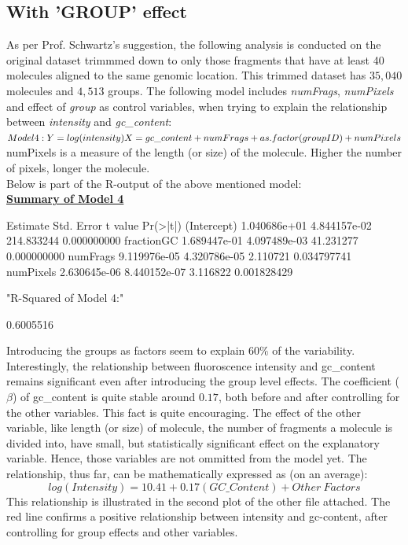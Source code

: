\documentclass[11pt]{article}
\begin{document}
\subsection{With 'GROUP' effect}
As per Prof. Schwartz's suggestion, the following analysis is conducted on the original dataset trimmmed down to only those fragments that have at least 40 molecules aligned to the same genomic location. This trimmed dataset has $35,040$ molecules and $4,513$ groups. The following model includes {\emph{numFrags}}, {\emph{numPixels}} and effect of {\emph{group}} as control variables, when trying to explain the relationship between {\emph{intensity}} and {\emph{gc\_content}}:
$Model4:\\ Y = log(intensity) \\ X = gc\_content + numFrags + as.factor(groupID) + numPixels$ \\
numPixels is a measure of the length (or size) of the molecule. Higher the number of pixels, longer the molecule. 
\\
Below is part of the R-output of the above mentioned model:\\
\noindent
{\bf{\underline{Summary of Model 4}}}
\begin{Schunk}
\begin{Soutput}
                Estimate   Std. Error    t value    Pr(>|t|)
(Intercept) 1.040686e+01 4.844157e-02 214.833244 0.000000000
fractionGC  1.689447e-01 4.097489e-03  41.231277 0.000000000
numFrags    9.119976e-05 4.320786e-05   2.110721 0.034797741
numPixels   2.630645e-06 8.440152e-07   3.116822 0.001828429
\end{Soutput}
\begin{Soutput}
[1] "R-Squared of Model 4:"
\end{Soutput}
\begin{Soutput}
[1] 0.6005516
\end{Soutput}
\end{Schunk}
Introducing the groups as factors seem to explain $60\%$ of the variability. Interestingly, the relationship between fluoroscence intensity and gc\_content remains significant even after introducing the group level effects. The coefficient ($\beta$) of gc\_content is quite stable around $0.17$, both before and after controlling for the other variables. This fact is quite encouraging. The effect of the other variable, like length (or size) of molecule, the number of fragments a molecule is divided into, have small, but statistically significant effect on the explanatory variable. Hence, those variables are not ommitted from the model yet. The relationship, thus far, can be mathematically expressed as (on an average):
\begin{equation}
log(Intensity) = 10.41 + 0.17(GC\_Content) + Other\ Factors
\end{equation}
This relationship is illustrated in the second plot of the other file attached. The red line confirms a positive relationship between intensity and gc-content, after controlling for group effects and other variables.
%
\end{document}
